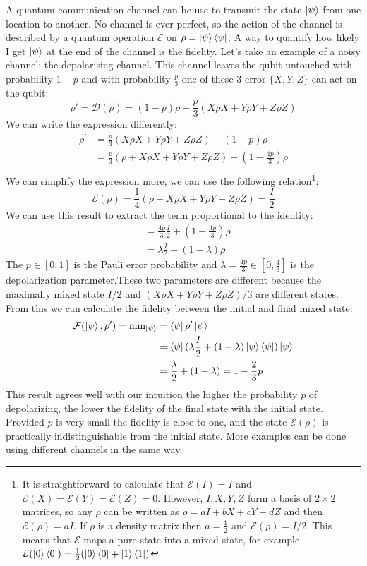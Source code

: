 A quantum communication channel can be use to transmit the state $\ket{\psi}$ from one location to another. No channel is ever perfect, so the action of the channel is described by a quantum operation $\mathcal{E}$ on $\rho=\ket{\psi}\bra{\psi}$. A way to quantify how likely I get $\ket{\psi}$ at the end of the channel is the fidelity. 
Let's take an example of a noisy channel: the depolarising channel. This channel leaves the qubit untouched with probability $1-p$ and with probability $\frac{p}{3}$ one of these 3 error $\{X,Y,Z\}$ can act on the qubit: 
\begin{equation}
    \rho'=\mathcal{D}(\rho) = (1-p)\rho + \frac{p}{3}\left(X\rho X +Y \rho Y+Z \rho Z\right)
\end{equation}
We can write the expression differently: 
$$
\begin{aligned}
\rho^{\prime} &=\frac{p}{3}(X \rho X+Y \rho Y+Z \rho Z)+(1-p) \rho \\
&=\frac{p}{3}(\rho+X \rho X+Y \rho Y+Z \rho Z)+\left(1-\frac{4 p}{3}\right) \rho \\
\end{aligned}
$$
We can simplify the expression more, we can use the following relation\footnote{It is straightforward to calculate that $\mathcal{E}(I)=I$ and $\mathcal{E}(X)=\mathcal{E}(Y)=\mathcal{E}(Z)=0$. However, $I, X, Y, Z$ form a basis of $2\times2$ matrices, so any $\rho$ can be written as $\rho=a I+b X+c Y+d Z$ and then $\mathcal{E}(\rho)=a I$. If $\rho$ is a density matrix then $a=\frac{1}{2}$ and $\mathcal{E}(\rho)=I / 2$. This means that $\mathcal{E}$ maps a pure state into a mixed state, for example $\mathcal{E}(\ket{0}\bra{0}) =\frac{1}{2}(\ket{0}\bra{0} + \ket{1}\bra{1})$}: 
$$
\mathcal{E}(\rho)=\frac{1}{4}(\rho+X \rho X+Y \rho Y+Z \rho Z)=\frac{I}{2}
$$
We can use this result to extract the term proportional to the identity: 
$$
\begin{aligned}
&=\frac{4 p}{3} \frac{I}{2}+\left(1-\frac{4 p}{3}\right) \rho \\
&=\lambda \frac{I}{2}+(1-\lambda) \rho
\end{aligned}
$$
The $p \in[0,1]$ is the Pauli error probability and $\lambda=\frac{4 p}{3} \in\left[0, \frac{4}{3}\right]$ is the depolarization parameter.These two parameters are different because the maximally mixed state $I / 2$ and $(X \rho X+Y \rho Y+Z \rho Z) / 3$ are different states.
From this we can calculate the fidelity between the initial and final mixed state: 
\begin{align*}
    \mathcal{F}(\ket{\psi},\rho') = \text{min}_{\ket{\psi}} &= \bra{\psi}\rho'\ket{\psi} \\
    &= \bra{\psi}(\lambda \frac{I}{2}+(1-\lambda) \ket{\psi}\bra{\psi})\ket{\psi} \\
    &= \frac{\lambda}{2} + (1-\lambda) = 1-\frac{2}{3}p 
\end{align*}
This result agrees well with our intuition the higher the probability $p$ of depolarizing, the lower the fidelity of the final state with the initial state. Provided $p$ is very small the fidelity is close to one, and the state $\mathcal{E}(\rho)$ is practically indistinguishable from the initial state. More examples can be done using different channels in the same way.


